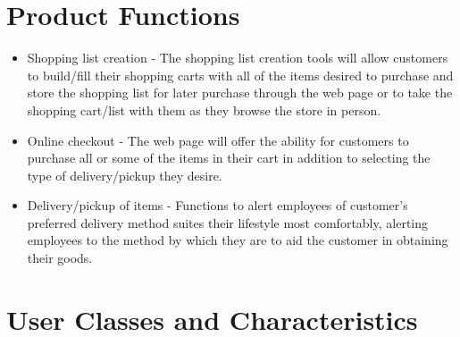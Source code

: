 \documentclass{scrreprt}
\theoremstyle{funreq}
\begin{document}
\section{Product Functions}
\begin{itemize}
    \item Shopping list creation - The shopping list creation tools will allow customers to build/fill their shopping carts with all of the items desired to purchase and store the shopping list for later purchase through the web page or to take the shopping cart/list with them as they browse the store in person.
    \item Online checkout - The web page will offer the ability for customers to purchase all or some of the items in their cart in addition to selecting the type of delivery/pickup they desire.
    \item Delivery/pickup of items - Functions to alert employees of customer's  preferred delivery method suites their lifestyle most comfortably, alerting employees to the method by which they are to aid the customer in obtaining their goods.
\end{itemize}%

\section{User Classes and Characteristics}
\end{document}

